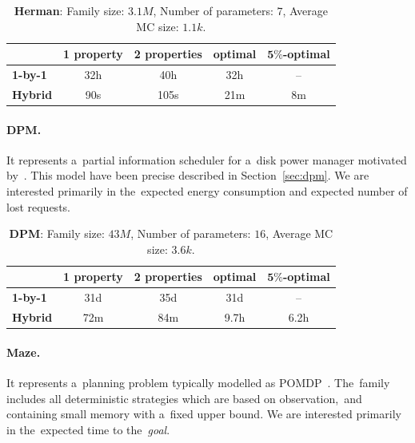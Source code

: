 \begin{table}[h!]
\centering
\begin{tabular}{l|cccc}
    \hline \hline 
    & \multicolumn{1}{l}{\textbf{1 property}} & \multicolumn{1}{l}{\textbf{2 properties}} & \multicolumn{1}{l}{\textbf{optimal}} & \multicolumn{1}{l}{\textbf{$\mathbf{5\%}$-optimal}} \\ \hline
    \textbf{1-by-1} & 32h & 40h & 32h & \,--\, \\
    \textbf{Hybrid} & 90s & 105s & 21m & 8m \\ \hline \hline
\end{tabular}
\caption{\textbf{Herman}: Family size: $3.1M$, Number of parameters: $7$, Average MC size: $1.1k$.}
\end{table}

\paragraph{DPM.}
It represents a~partial information scheduler for a~disk power manager motivated by~\cite{dpm1}.
This model have been precise described in Section~\ref{sec:dpm}.
We are interested primarily in the~expected energy consumption and expected number of lost requests.

\begin{table}[h!]
\centering
\begin{tabular}{l|cccc}
    \hline \hline 
    & \multicolumn{1}{l}{\textbf{1 property}} & \multicolumn{1}{l}{\textbf{2 properties}} & \multicolumn{1}{l}{\textbf{optimal}} & \multicolumn{1}{l}{\textbf{$\mathbf{5\%}$-optimal}} \\ \hline
    \textbf{1-by-1} & 31d & 35d & 31d & \,--\, \\
    \textbf{Hybrid} & 72m & 84m & 9.7h & 6.2h \\ \hline \hline
\end{tabular}
\caption{\textbf{DPM}:  Family size: $43M$, Number of parameters: $16$, Average MC size: $3.6k$.}
\end{table}

\paragraph{Maze.}
It represents a~planning problem typically modelled as POMDP~\cite{maze}.
The~family includes all deterministic strategies which are based on observation,~and containing small memory with a~fixed upper bound.
We are interested primarily in the~expected time to the~\emph{goal}.

